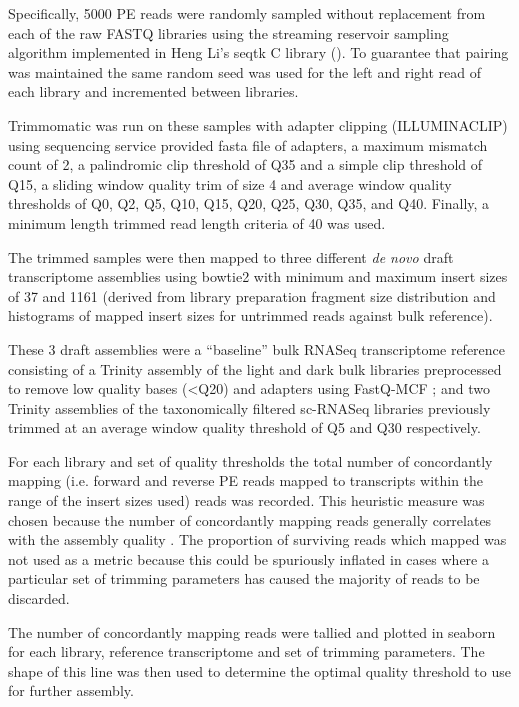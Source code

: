 Specifically, 5000 PE reads were randomly sampled without replacement from each of the raw FASTQ libraries 
using the streaming reservoir sampling \citep{Vitter1985} algorithm implemented in Heng Li's 
seqtk C library (\citep{SeqtkGitHub}).
To guarantee that pairing was maintained the same random seed was used for the left and right read
of each library and incremented between libraries.

Trimmomatic \citep{Bolger2014a} was run on these samples with adapter clipping (ILLUMINACLIP)
using sequencing service provided fasta file of adapters, a maximum mismatch count of 2,
a palindromic clip threshold of Q35 and a simple clip threshold of Q15, a sliding window
quality trim of size 4 and average window quality thresholds of Q0, Q2, Q5, Q10, Q15, Q20, Q25, Q30, Q35, and Q40.
Finally, a minimum length trimmed read length criteria of \SI{40}{\bp} was used.  


The trimmed samples were then mapped to three different \textit{de novo} draft transcriptome assemblies using bowtie2
\citep{Langmead2012} with minimum and maximum insert sizes of \SI{37}{\bp} and \SI{1161}{\bp} (derived from library preparation
fragment size distribution and histograms of mapped insert sizes for untrimmed reads against bulk reference).

These 3 draft assemblies were a ``baseline'' bulk RNASeq transcriptome reference consisting of a Trinity \citep{Haas2013} 
assembly of the light and dark bulk libraries preprocessed to remove low quality bases (<Q20) and adapters using FastQ-MCF \citep{Aronesty2013};
and two Trinity assemblies of the taxonomically filtered sc-RNASeq libraries previously trimmed 
at an average window quality threshold of Q5 and Q30 respectively.


For each library and set of quality thresholds the total number of concordantly
mapping (i.e. forward and reverse PE reads mapped to transcripts within the range of the insert sizes used)
reads was recorded.  This heuristic measure was chosen because the number of concordantly mapping reads generally correlates
with the assembly quality \citep{Macmanes2014}. The proportion of surviving reads which mapped 
was not used as a metric because this could be spuriously inflated in cases where a particular
set of trimming parameters has caused the majority of reads to be discarded.

The number of concordantly mapping reads were tallied and plotted in seaborn 
for each library, reference transcriptome and set of trimming parameters.
The shape of this line was then used to determine the optimal quality 
threshold to use for further assembly.

